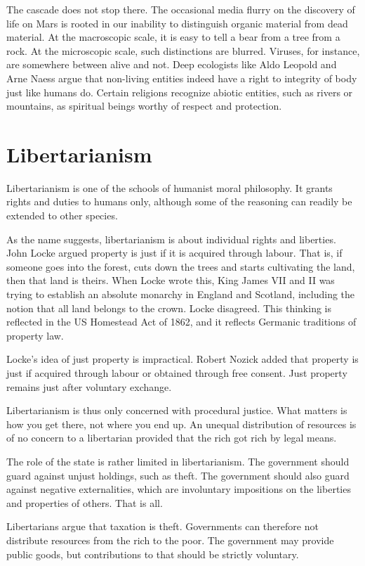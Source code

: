 The cascade does not stop there. The occasional media flurry on the discovery of life on Mars is rooted in our inability to distinguish organic material from dead material. At the macroscopic scale, it is easy to tell a bear from a tree from a rock. At the microscopic scale, such distinctions are blurred. Viruses, for instance, are somewhere between alive and not. Deep ecologists like Aldo Leopold and Arne Naess argue that non-living entities indeed have a right to integrity of body just like humans do. Certain religions recognize abiotic entities, such as rivers or mountains, as spiritual beings worthy of respect and protection.

\section{Libertarianism}
Libertarianism is one of the schools of humanist moral philosophy. It grants rights and duties to humans only, although some of the reasoning can readily be extended to other species.

As the name suggests, libertarianism is about individual rights and liberties. John Locke argued property is just if it is acquired through labour. That is, if someone goes into the forest, cuts down the trees and starts cultivating the land, then that land is theirs. When Locke wrote this, King James VII and II was trying to establish an absolute monarchy in England and Scotland, including the notion that all land belongs to the crown. Locke disagreed. This thinking is reflected in the US Homestead Act of 1862, and it reflects Germanic traditions of property law.

Locke's idea of just property is impractical. Robert Nozick added that property is just if acquired through labour or obtained through free consent. Just property remains just after voluntary exchange.

Libertarianism is thus only concerned with procedural justice. What matters is how you get there, not where you end up. An unequal distribution of resources is of no concern to a libertarian provided that the rich got rich by legal means.

The role of the state is rather limited in libertarianism. The government should guard against unjust holdings, such as theft. The government should also guard against negative externalities, which are involuntary impositions on the liberties and properties of others. That is all.

Libertarians argue that taxation is theft. Governments can therefore not distribute resources from the rich to the poor. The government may provide public goods, but contributions to that should be strictly voluntary.

